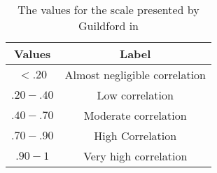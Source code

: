 \begin{table}[H]
    \centering

    \begin{tabular}{|| c | c ||}
        \hline
        \textbf{Values} & \textbf{Label} \\ [0.5ex] \hline\hline
        $<.20$ & Almost negligible correlation \\
        $.20-.40$ & Low correlation \\
        $.40-.70$ & Moderate correlation \\
        $.70-.90$ & High Correlation \\
        $.90-1$ & Very high correlation \\ \hline
    \end{tabular}
    \caption{The values for the scale presented by Guildford in \cite[219]{guilford1950fundamental}}
    \label{fig:GuildfordScale}
\end{table}
